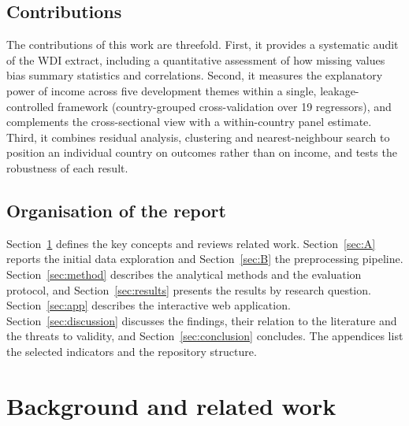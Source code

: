\documentclass[11pt,a4paper]{article}
\begin{document}
\subsection{Contributions}
The contributions of this work are threefold. First, it provides a systematic audit of the WDI extract, including a quantitative assessment of how missing values bias summary statistics and correlations. Second, it measures the explanatory power of income across five development themes within a single, leakage-controlled framework (country-grouped cross-validation over 19 regressors), and complements the cross-sectional view with a within-country panel estimate. Third, it combines residual analysis, clustering and nearest-neighbour search to position an individual country on outcomes rather than on income, and tests the robustness of each result.

\subsection{Organisation of the report}
Section~\ref{sec:related} defines the key concepts and reviews related work. Section~\ref{sec:A} reports the initial data exploration and Section~\ref{sec:B} the preprocessing pipeline. Section~\ref{sec:method} describes the analytical methods and the evaluation protocol, and Section~\ref{sec:results} presents the results by research question. Section~\ref{sec:app} describes the interactive web application. Section~\ref{sec:discussion} discusses the findings, their relation to the literature and the threats to validity, and Section~\ref{sec:conclusion} concludes. The appendices list the selected indicators and the repository structure.

\section{Background and related work}\label{sec:related}
\end{document}

